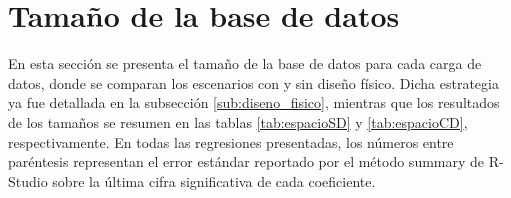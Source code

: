 \documentclass[12pt, letter paper]{report}
\begin{document}
    \section{Tamaño de la base de datos} %
    \label{sec:tamaño_de_la_base_de_datos}
      En esta sección se presenta el tamaño de la base de datos para cada carga
      de datos, donde se comparan los escenarios con y sin diseño físico. Dicha
      estrategia ya fue detallada en la subsección \ref{sub:diseno_fisico},
      mientras que los resultados de los tamaños se resumen en las tablas
      \ref{tab:espacioSD} y \ref{tab:espacioCD}, respectivamente. En todas las
      regresiones presentadas, los números entre paréntesis representan el error
      estándar reportado por el método summary de R-Studio sobre la última cifra
      significativa de cada coeficiente.
\end{document}
